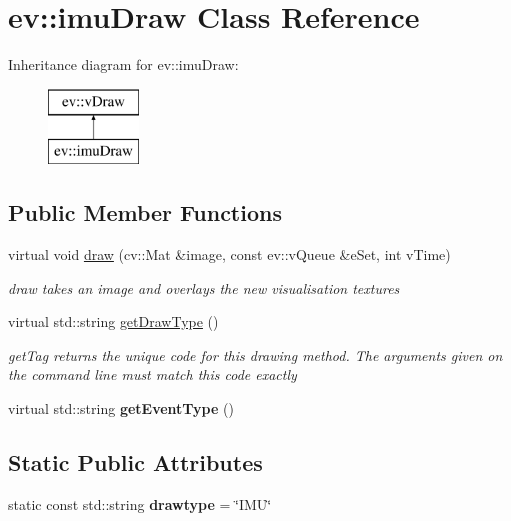 \hypertarget{classev_1_1imuDraw}{}\section{ev\+:\+:imu\+Draw Class Reference}
\label{classev_1_1imuDraw}
Inheritance diagram for ev\+:\+:imu\+Draw\+:\begin{figure}[H]
\begin{center}
\leavevmode
\includegraphics[height=2.000000cm]{classev_1_1imuDraw}
\end{center}
\end{figure}
\subsection*{Public Member Functions}
\begin{DoxyCompactItemize}
\item 
virtual void \hyperlink{classev_1_1imuDraw_addbaf0eff95fe6e791ca53c36218267e}{draw} (cv\+::\+Mat \&image, const ev\+::v\+Queue \&e\+Set, int v\+Time)
\begin{DoxyCompactList}\small\item\em draw takes an image and overlays the new visualisation textures \end{DoxyCompactList}\item 
virtual std\+::string \hyperlink{classev_1_1imuDraw_ab622b53cbe53421958cb7572919a0318}{get\+Draw\+Type} ()
\begin{DoxyCompactList}\small\item\em get\+Tag returns the unique code for this drawing method. The arguments given on the command line must match this code exactly \end{DoxyCompactList}\item 
\mbox{\label{classev_1_1imuDraw_a21d47d10bbafe24e9633ec464d6fd060}} 
virtual std\+::string {\bfseries get\+Event\+Type} ()
\end{DoxyCompactItemize}
\subsection*{Static Public Attributes}
\begin{DoxyCompactItemize}
\item 
\mbox{\label{classev_1_1imuDraw_a2447e11bc738f17ed6d46da1ad542ca0}} 
static const std\+::string {\bfseries drawtype} = \char`\"{}I\+MU\char`\"{}
\end{DoxyCompactItemize}
